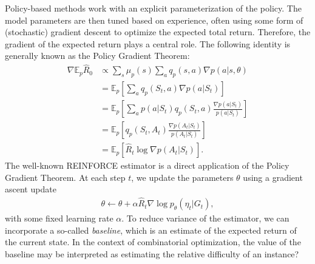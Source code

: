 \documentclass[a4paper]{report}
\theoremstyle{definition}
\theoremstyle{plain}
\begin{document}
Policy-based methods work with an explicit parameterization of the policy. The
model parameters are then tuned based on experience, often using some form of
(stochastic) gradient descent to optimize the expected total return.
%
Therefore, the gradient of the expected return
plays a central role. The
following identity is generally known as the Policy Gradient Theorem:
\begin{align*}
  \nabla \mathbb{E}_{p} \hat{R}_{0} &\propto \sum_{s} \mu_{p}(s) \sum_{a} q_{p}(s, a) \nabla p(a | s, \theta) \\
  &= \mathbb{E}_{p}\left[ \sum_{a} q_{p} (S_{t}, a) \nabla p (a | S_{t}) \right] \\
  &= \mathbb{E}_{p}\left[ \sum_{a} p(a | S_{t}) q_{p} (S_{t}, a) \frac{\nabla p (a | S_{t})}{p (a | S_{t})} \right] \\
  &= \mathbb{E}_{p}\left[ q_{p} (S_{t}, A_{t}) \frac{\nabla p (A_{t} | S_{t})}{p (A_{t} | S_{t})} \right] \\
  &= \mathbb{E}_{p} \left[ \hat{R}_{t} \log \nabla p (A_{t} | S_{t}) \right] .
\end{align*}
%
The well-known REINFORCE estimator is a direct application of the Policy
Gradient Theorem. At each step $t$, we update the parameters $\theta$ using a
gradient ascent update
\begin{align*}
  \theta \leftarrow \theta + \alpha \hat{R}_{t} \nabla \log p_{\theta}(\eta_{t} | G_{t}) ,
\end{align*}
with some fixed learning rate $\alpha$.
To reduce variance of the estimator, we can incorporate a so-called
\textit{baseline}, which is an estimate of the expected return of the current
state.
%
In the context of combinatorial optimization, the value of the baseline may be
interpreted as estimating the relative difficulty of an instance?
\end{document}
